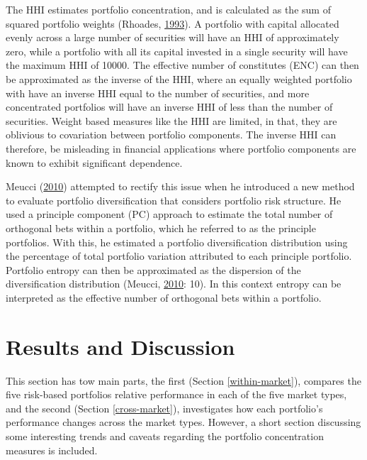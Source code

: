 \documentclass[11pt,preprint, authoryear]{elsarticle}
\numberwithin{equation}{section}
\numberwithin{figure}{section}
\numberwithin{table}{section}
\begin{document}
The HHI estimates portfolio concentration, and is calculated as the sum
of squared portfolio weights (Rhoades,
\protect\hyperlink{ref-rhoades1993}{1993}). A portfolio with capital
allocated evenly across a large number of securities will have an HHI of
approximately zero, while a portfolio with all its capital invested in a
single security will have the maximum HHI of 10000. The effective number
of constitutes (ENC) can then be approximated as the inverse of the HHI,
where an equally weighted portfolio with have an inverse HHI equal to
the number of securities, and more concentrated portfolios will have an
inverse HHI of less than the number of securities. Weight based measures
like the HHI are limited, in that, they are oblivious to covariation
between portfolio components. The inverse HHI can therefore, be
misleading in financial applications where portfolio components are
known to exhibit significant dependence.

Meucci (\protect\hyperlink{ref-meucci2010}{2010}) attempted to rectify
this issue when he introduced a new method to evaluate portfolio
diversification that considers portfolio risk structure. He used a
principle component (PC) approach to estimate the total number of
orthogonal bets within a portfolio, which he referred to as the
principle portfolios. With this, he estimated a portfolio
diversification distribution using the percentage of total portfolio
variation attributed to each principle portfolio. Portfolio entropy can
then be approximated as the dispersion of the diversification
distribution (Meucci, \protect\hyperlink{ref-meucci2010}{2010}: 10). In
this context entropy can be interpreted as the effective number of
orthogonal bets within a portfolio.

\hypertarget{results-and-discussion}{%
\section{\texorpdfstring{Results and Discussion
\label{reasults}}{Results and Discussion }}\label{results-and-discussion}}

This section has tow main parts, the first (Section
\ref{within-market}), compares the five risk-based portfolios relative
performance in each of the five market types, and the second (Section
\ref{cross-market}), investigates how each portfolio's performance
changes across the market types. However, a short section discussing
some interesting trends and caveats regarding the portfolio
concentration measures is included.
\end{document}
